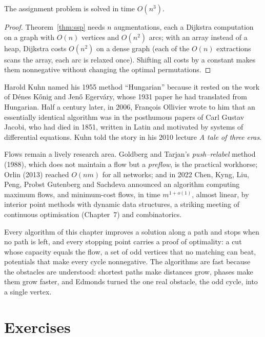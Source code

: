 \begin{corollary}\label{cor:hungarian}
The assignment problem is solved in time $O(n^3)$.
\end{corollary}
\begin{proof}
Theorem~\ref{thm:ssp} needs $n$ augmentations, each a Dijkstra computation on a graph with $O(n)$ vertices and $O(n^2)$ arcs; with an array instead of a heap, Dijkstra costs $O(n^2)$ on a dense graph (each of the $O(n)$ extractions scans the array, each arc is relaxed once).
Shifting all costs by a constant makes them nonnegative without changing the optimal permutations.
\end{proof}

Harold Kuhn named his 1955 method ``Hungarian'' because it rested on the work of D\'enes K\H onig and Jen\H o Egerv\'ary, whose 1931 paper he had translated from Hungarian. Half a century later, in 2006, Fran\c cois Ollivier wrote to him that an essentially identical algorithm was in
the posthumous papers of Carl Gustav Jacobi, who had died in 1851, written in Latin and motivated by systems of differential equations. Kuhn told the story in his 2010 lecture \emph{A tale of three eras}.

\begin{remark}
Flows remain a lively research area. Goldberg and Tarjan's \emph{push--relabel} method (1988), which does not maintain a flow but a \emph{preflow}, is the practical workhorse; Orlin (2013) reached $O(nm)$ for all networks; and in 2022 Chen, Kyng, Liu, Peng, Probst Gutenberg and Sachdeva
announced an algorithm computing maximum flows, and minimum-cost flows, in time $m^{1+o(1)}$, almost linear, by interior point methods with dynamic data structures, a striking meeting of continuous optimisation (Chapter~7) and combinatorics.
\end{remark}

\begin{beauty}
Every algorithm of this chapter improves a solution along a path and stops when no path is left, and every stopping point carries a proof of optimality: a cut whose capacity equals the flow, a set of odd vertices
that no matching can beat, potentials that make every cycle nonnegative. The algorithms are fast because the obstacles are understood: shortest paths make distances grow, phases make them grow faster, and Edmonds turned the one real obstacle, the odd
cycle, into a single vertex.
\end{beauty}

\section{Exercises}

